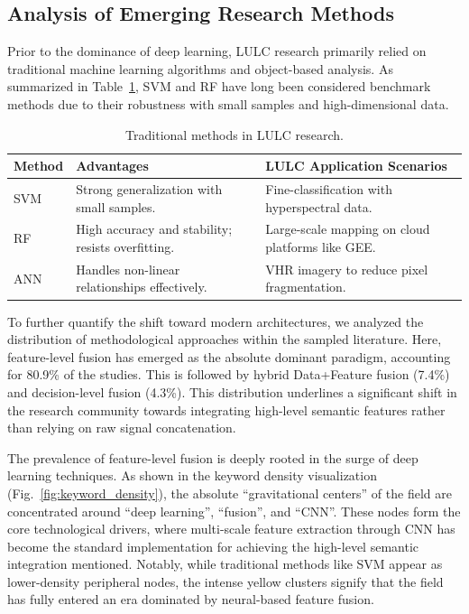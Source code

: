 \documentclass[]{interact}
\theoremstyle{plain}%
\theoremstyle{definition}
\theoremstyle{remark}
\begin{document}
\subsection{Analysis of Emerging Research Methods}
Prior to the dominance of deep learning, LULC research primarily relied on traditional machine learning algorithms and object-based analysis. As summarized in Table~\ref{tab:traditional_methods}, SVM and RF have long been considered benchmark methods due to their robustness with small samples and high-dimensional data.

\begin{table}[!ht]
	\centering
	\setlength{\belowcaptionskip}{5pt} 
	\caption{Traditional methods in LULC research.} 
	\label{tab:traditional_methods}
	\small 
	\renewcommand{\arraystretch}{1.4} 
	\begin{tabular}{@{} p{2.5cm} p{5.5cm} p{6.5cm} @{}} 
		\toprule
		\textbf{Method} & \textbf{Advantages} & \textbf{LULC Application Scenarios} \\ 
		\midrule
		SVM & Strong generalization with small samples. & Fine-classification with hyperspectral data. \\ \addlinespace[3pt]
		RF  & High accuracy and stability; resists overfitting. & Large-scale mapping on cloud platforms like GEE. \\ \addlinespace[3pt]
		ANN & Handles non-linear relationships effectively. & VHR imagery to reduce pixel fragmentation. \\ 
		\bottomrule
	\end{tabular}
\end{table}

To further quantify the shift toward modern architectures, we analyzed the distribution of methodological approaches within the sampled literature. Here, feature-level fusion has emerged as the absolute dominant paradigm, accounting for 80.9\% of the studies. This is followed by hybrid Data+Feature fusion (7.4\%) and decision-level fusion (4.3\%). This distribution underlines a significant shift in the research community towards integrating high-level semantic features rather than relying on raw signal concatenation.


The prevalence of feature-level fusion is deeply rooted in the surge of deep learning techniques. As shown in the keyword density visualization (Fig.~\ref{fig:keyword_density}), the absolute ``gravitational centers'' of the field are concentrated around ``deep learning'', ``fusion'', and ``CNN''. These nodes form the core technological drivers, where multi-scale feature extraction through CNN has become the standard implementation for achieving the high-level semantic integration mentioned. Notably, while traditional methods like SVM appear as lower-density peripheral nodes, the intense yellow clusters signify that the field has fully entered an era dominated by neural-based feature fusion.
\end{document}

